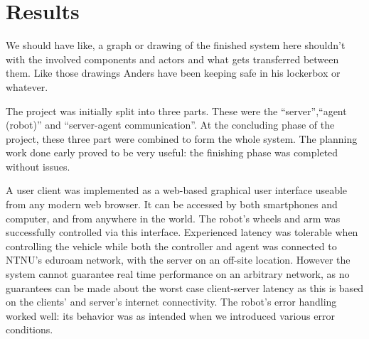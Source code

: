 \chapter{Results}
We should have like, a graph or drawing of the finished system here shouldn't with the involved components and actors and what gets transferred between them.
Like those drawings Anders have been keeping safe in his lockerbox or whatever.


The project was initially split into three parts.
These were the ``server'',``agent (robot)'' and ``server-agent communication''. 
At the concluding phase of the project, these three part were combined to form the whole system.
The planning work done early proved to be very useful: the finishing phase was completed without issues.

A user client was implemented as a web-based graphical user interface useable from any modern web browser.
It can be accessed by both smartphones and computer, and from anywhere in the world. 
The robot's wheels and arm was successfully controlled via this interface.
Experienced latency was tolerable when controlling the vehicle while both the controller and agent was connected to NTNU's eduroam network, with the server on an off-site location.
However the system cannot guarantee real time performance on an arbitrary network, as no guarantees can be made about the worst case client-server latency as this is based on the clients' and server's internet connectivity.
The robot's error handling worked well: its behavior was as intended when we introduced various error conditions.

